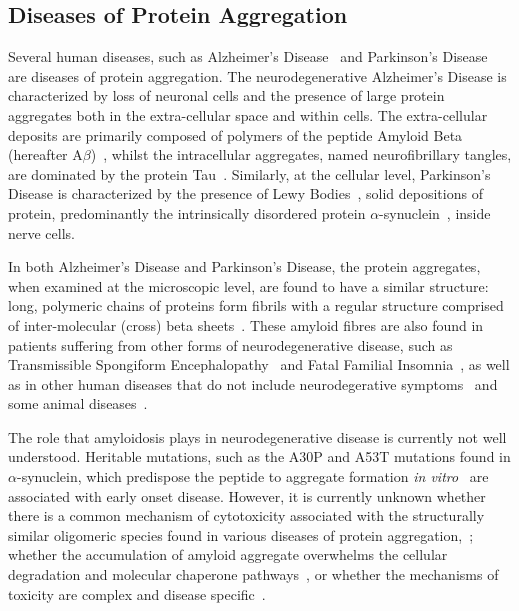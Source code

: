 \subsection{Diseases of Protein Aggregation}
Several human diseases, such as Alzheimer's Disease~\cite{ueda1993} and Parkinson's Disease~\cite{spillantini1997} are diseases of protein aggregation. The neurodegenerative Alzheimer's Disease is characterized by loss of neuronal cells and the presence of large protein aggregates both in the extra-cellular space and within cells. The extra-cellular deposits are primarily composed of polymers of the peptide Amyloid Beta (hereafter A${\beta}$)~\cite{Noe2004}, whilst the intracellular aggregates, named neurofibrillary tangles, are dominated by the protein Tau~\cite{goedert1989}. Similarly, at the cellular level, Parkinson's Disease is characterized by the presence of Lewy Bodies~\cite{Gibb1988}, solid depositions of protein, predominantly the intrinsically disordered protein $\alpha$-synuclein~\cite{spillantini1997}, inside nerve cells.


In both Alzheimer's Disease and Parkinson's Disease, the protein aggregates, when examined at the microscopic level, are found to have a similar structure: long, polymeric chains of proteins form fibrils with a regular structure comprised of inter-molecular (cross) beta sheets~\cite{Serpell2000}. These amyloid fibres are also found in patients suffering from other forms of neurodegenerative disease, such as Transmissible Spongiform Encephalopathy~\cite{Wells1987} and Fatal Familial Insomnia~\cite{Goldfarb1992}, as well as in other human diseases that do not include neurodegerative symptoms~\cite{Clark1988} and some animal diseases~\cite{Safar1993}. 


The role that amyloidosis plays in neurodegenerative disease is currently not well understood. Heritable mutations, such as the A30P and A53T mutations found in $\alpha$-synuclein, which predispose the peptide to aggregate formation \emph{in vitro}~\cite{Conway1999} are associated with early onset disease. However, it is currently unknown whether there is a common mechanism of cytotoxicity associated with the structurally similar oligomeric species found in various diseases of protein aggregation,~\cite{Haas2007}; whether the accumulation of amyloid aggregate overwhelms the cellular degradation and molecular chaperone pathways~\cite{Muchowski2005}, or whether the mechanisms of toxicity are complex and disease specific~\cite{Benilova2012}.      

